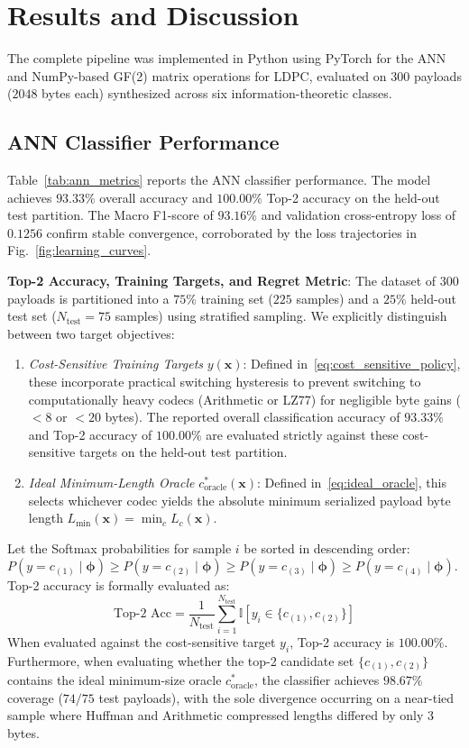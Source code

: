 \documentclass[conference]{IEEEtran}
\begin{document}
\section{Results and Discussion}
\label{sec:results}

The complete pipeline was implemented in Python using PyTorch for the ANN and NumPy-based GF(2) matrix operations for LDPC, evaluated on $300$ payloads ($2048$ bytes each) synthesized across six information-theoretic classes.

\subsection{ANN Classifier Performance}
Table~\ref{tab:ann_metrics} reports the ANN classifier performance. The model achieves $93.33\%$ overall accuracy and $100.00\%$ Top-2 accuracy on the held-out test partition. The Macro F1-score of $93.16\%$ and validation cross-entropy loss of $0.1256$ confirm stable convergence, corroborated by the loss trajectories in Fig.~\ref{fig:learning_curves}.

\textbf{Top-2 Accuracy, Training Targets, and Regret Metric}: The dataset of $300$ payloads is partitioned into a $75\%$ training set ($225$ samples) and a $25\%$ held-out test set ($N_{\text{test}} = 75$ samples) using stratified sampling. We explicitly distinguish between two target objectives:
\begin{enumerate}
    \item \textit{Cost-Sensitive Training Targets} $y(\mathbf{x})$: Defined in~\eqref{eq:cost_sensitive_policy}, these incorporate practical switching hysteresis to prevent switching to computationally heavy codecs (Arithmetic or LZ77) for negligible byte gains ($<8$ or $<20$ bytes). The reported overall classification accuracy of $\mathbf{93.33\%}$ and Top-2 accuracy of $\mathbf{100.00\%}$ are evaluated strictly against these cost-sensitive targets on the held-out test partition.
    \item \textit{Ideal Minimum-Length Oracle} $c^*_{\text{oracle}}(\mathbf{x})$: Defined in~\eqref{eq:ideal_oracle}, this selects whichever codec yields the absolute minimum serialized payload byte length $L_{\min}(\mathbf{x}) = \min_{c} L_c(\mathbf{x})$.
\end{enumerate}
Let the Softmax probabilities for sample $i$ be sorted in descending order: $P(y = c_{(1)} \mid \bm{\phi}) \ge P(y = c_{(2)} \mid \bm{\phi}) \ge P(y = c_{(3)} \mid \bm{\phi}) \ge P(y = c_{(4)} \mid \bm{\phi})$. Top-2 accuracy is formally evaluated as:
\begin{equation}
    \text{Top-2 Acc} = \frac{1}{N_{\text{test}}} \sum_{i=1}^{N_{\text{test}}} \mathbb{I}\left[y_i \in \{c_{(1)}, c_{(2)}\}\right]
\end{equation}
When evaluated against the cost-sensitive target $y_i$, Top-2 accuracy is $\mathbf{100.00\%}$. Furthermore, when evaluating whether the top-2 candidate set $\{c_{(1)}, c_{(2)}\}$ contains the ideal minimum-size oracle $c^*_{\text{oracle}}$, the classifier achieves $\mathbf{98.67\%}$ coverage ($74/75$ test payloads), with the sole divergence occurring on a near-tied sample where Huffman and Arithmetic compressed lengths differed by only 3 bytes.
\end{document}
